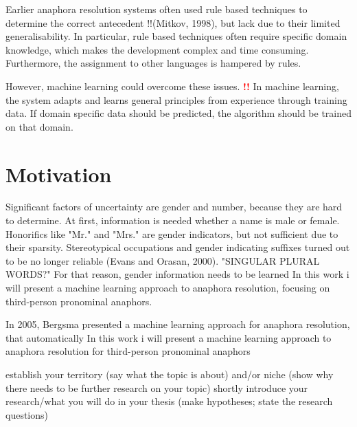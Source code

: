 Earlier anaphora resolution systems often used rule based techniques to determine the correct antecedent !!(Mitkov, 1998), but lack due to their limited generalisability. In particular, rule based techniques often require specific domain knowledge, which makes the development complex and time consuming. Furthermore, the assignment to other languages is hampered by rules.

However, machine learning could overcome these issues.
\textcolor{red} {\textbf{!!}}  In machine learning, the system adapts and learns general principles from experience through training data. If domain specific data should be predicted, the algorithm should be trained on that domain.

\section{Motivation}
Significant factors of uncertainty are gender and number, because they are hard to determine. At first, information is needed whether a name is male or female. Honorifics like "Mr." and "Mrs." are gender indicators, but not sufficient due to their sparsity. Stereotypical occupations and gender indicating suffixes turned out to be no longer reliable (Evans and Orasan, 2000).  "SINGULAR PLURAL WORDS?"  For that reason, gender information needs to be learned 
In this work i will present a machine learning approach to anaphora resolution, focusing on third-person pronominal anaphors.

In 2005, Bergsma presented a machine learning approach for anaphora resolution, that automatically 
In this work i will present a machine learning approach to anaphora resolution for third-person pronominal anaphors








establish your territory (say what the topic is about) and/or niche (show why there needs to be further research on your topic)
shortly introduce your research/what you will do in your thesis (make hypotheses; state the research questions)



